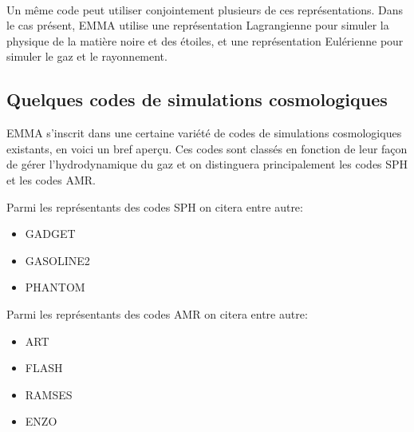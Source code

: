 
\paragraph{}
Un même code peut utiliser conjointement plusieurs de ces représentations.
Dans le cas présent, EMMA utilise une représentation Lagrangienne pour simuler la physique de la matière noire et des étoiles, et une représentation Eulérienne pour simuler le gaz et le rayonnement.

\subsection{Quelques codes de simulations cosmologiques}

EMMA s'inscrit dans une certaine variété de codes de simulations cosmologiques existants, en voici un bref aperçu.
Ces codes sont classés en fonction de leur façon de gérer l'hydrodynamique du gaz et on distinguera principalement les codes \ac{SPH} et les codes \ac{AMR}.

Parmi les représentants des codes \ac{SPH} on citera entre autre:
\begin{itemize}
\item GADGET \citep{springel_cosmological_2005}
\item GASOLINE2 \citep{2017arXiv170703824W}
\item PHANTOM \citep{2017arXiv170203930P}
\end{itemize}

Parmi les représentants des codes \ac{AMR} on citera entre autre:
\begin{itemize}
\item ART \citep{1997ApJS..111...73K}
\item FLASH \citep{0067-0049-131-1-273}
\item RAMSES \citep{teyssier_cosmological_2002}
\item ENZO \citep{bryan_enzo:_2014}
\end{itemize}

